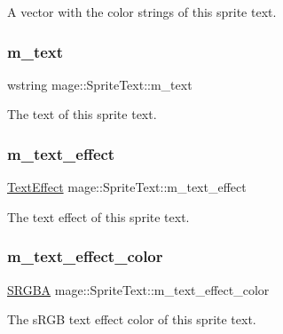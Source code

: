 A vector with the color strings of this sprite text. \hypertarget{classmage_1_1_sprite_text_a807d5dc467ef16f6c83762dfe6ad3391}{}\label{classmage_1_1_sprite_text_a807d5dc467ef16f6c83762dfe6ad3391} 
\subsubsection{\texorpdfstring{m\+\_\+text}{m\_text}}
{\footnotesize\ttfamily wstring mage\+::\+Sprite\+Text\+::m\+\_\+text\hspace{0.3cm}{\ttfamily [private]}}

The text of this sprite text. \hypertarget{classmage_1_1_sprite_text_a4019b7510bba20a9b86460fd6c47698f}{}\label{classmage_1_1_sprite_text_a4019b7510bba20a9b86460fd6c47698f} 
\subsubsection{\texorpdfstring{m\+\_\+text\+\_\+effect}{m\_text\_effect}}
{\footnotesize\ttfamily \hyperlink{classmage_1_1_sprite_text_ac60331e941d1f76551b7bdfad6ee7324}{Text\+Effect} mage\+::\+Sprite\+Text\+::m\+\_\+text\+\_\+effect\hspace{0.3cm}{\ttfamily [private]}}

The text effect of this sprite text. \hypertarget{classmage_1_1_sprite_text_a82f53e64dc8cc9a9d23a1c26ee9fad9e}{}\label{classmage_1_1_sprite_text_a82f53e64dc8cc9a9d23a1c26ee9fad9e} 
\subsubsection{\texorpdfstring{m\+\_\+text\+\_\+effect\+\_\+color}{m\_text\_effect\_color}}
{\footnotesize\ttfamily \hyperlink{structmage_1_1_s_r_g_b_a}{S\+R\+G\+BA} mage\+::\+Sprite\+Text\+::m\+\_\+text\+\_\+effect\+\_\+color\hspace{0.3cm}{\ttfamily [private]}}

The s\+R\+GB text effect color of this sprite text. 